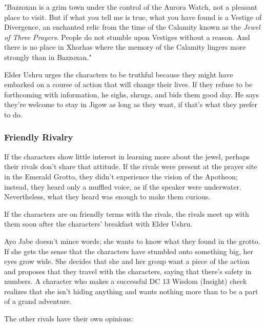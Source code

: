 \documentclass[10pt,a4paper,twoside,bg=print,twocolumn,openany,nodeprecatedcode]{dndbook}
\begin{document}
\begin{DndReadAloud}{}
"Bazzoxan is a grim town under the control of the Aurora Watch, not a pleasant place to visit. But if what you tell me is true, what you have found is a Vestige of Divergence, an enchanted relic from the time of the Calamity known as the \textit{Jewel of Three Prayers}. People do not stumble upon Vestiges without a reason. And there is no place in Xhorhas where the memory of the Calamity lingers more strongly than in Bazzoxan."

\end{DndReadAloud}

Elder Ushru urges the characters to be truthful because they might have embarked on a course of action that will change their lives. If they refuse to be forthcoming with information, he sighs, shrugs, and bids them good day. He says they're welcome to stay in Jigow as long as they want, if that's what they prefer to do.

\subsubsection{Friendly Rivalry}
If the characters show little interest in learning more about the jewel, perhaps their rivals don't share that attitude. If the rivals were present at the prayer site in the Emerald Grotto, they didn't experience the vision of the Apotheon; instead, they heard only a muffled voice, as if the speaker were underwater. Nevertheless, what they heard was enough to make them curious.

If the characters are on friendly terms with the rivals, the rivals meet up with them soon after the characters' breakfast with Elder Ushru.

Ayo Jabe doesn't mince words; she wants to know what they found in the grotto. If she gets the sense that the characters have stumbled onto something big, her eyes grow wide. She decides that she and her group want a piece of the action and proposes that they travel with the characters, saying that there's safety in numbers. A character who makes a successful DC 13 Wisdom (Insight) check realizes that she isn't hiding anything and wants nothing more than to be a part of a grand adventure.

The other rivals have their own opinions:
\end{document}
